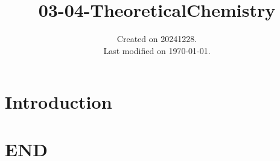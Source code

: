 \documentclass[UTF8]{../03-Chemistry}
\begin{document}
\title{03-04-TheoreticalChemistry}
\date{Created on 20241228.\\   Last modified on \today.}
\maketitle
\tableofcontents


\chapter{Introduction}





\chapter{END}
\end{document}
